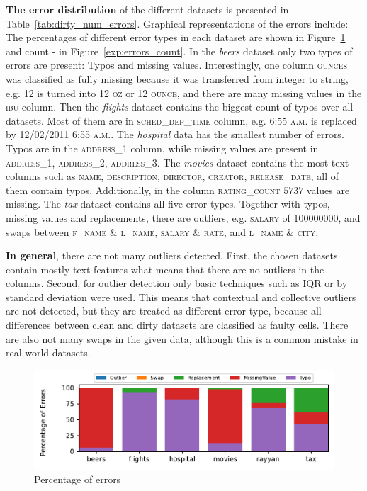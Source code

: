 \textbf{The error distribution} of the different datasets is presented in Table~\ref{tab:dirty_num_errors}. 
Graphical representations of the errors include: The percentages of different error types in each dataset are shown in Figure~\ref{exp:errors_percent} and count - in Figure~\ref{exp:errors_count}.
In the \textit{beers} dataset only two types of errors are present: Typos and missing values. 
Interestingly, one column \textsc{ounces} was classified as fully missing because it was transferred from integer to string, e.g. \textsc{12} is turned into \textsc{12 oz} or \textsc{12 ounce}, and there are many missing values in the \textsc{ibu} column.
Then the \textit{flights} dataset contains the biggest count of typos over all  datasets. 
Most of them are in \textsc{sched\_dep\_time} column, e.g. \textsc{6:55 a.m.} is replaced by \textsc{12/02/2011 6:55 a.m.}.
The \textit{hospital} data has the smallest number of errors. 
Typos are in the \textsc{address\_1} column, while missing values are present in \textsc{address\_1}, \textsc{address\_2}, \textsc{address\_3}.
The \textit{movies} dataset contains the most text columns such as \textsc{name}, \textsc{description}, \textsc{director}, \textsc{creator}, \textsc{release\_date}, all of them contain typos. Additionally, in the column \textsc{rating\_count} $5737$ values are missing.
The \textit{tax} dataset contains all five error types. 
Together with typos, missing values and replacements, there are outliers, e.g. \textsc{salary} of \textsc{100000000}, and swaps between \textsc{f\_name} \& \textsc{l\_name}, \textsc{salary} \& \textsc{rate}, and \textsc{l\_name} \& \textsc{city}. 

\textbf{In general}, there are not many outliers detected.
First, the chosen datasets contain mostly text features what means that there are no outliers in the columns.
Second, for outlier detection only basic techniques such as IQR or by standard deviation were used. 
This means that contextual and collective outliers are not detected, but they are treated as different error type, because all differences between clean and dirty datasets are classified as faulty cells.
There are also not many swaps in the given data, although this is a common mistake in real-world datasets.

\begin{figure}[!t]
    \centering
    \includegraphics[width=\textwidth]{figures/plot/error_percent/errors_percent.pdf}
    \caption{Percentage of errors}
    \label{exp:errors_percent}
\end{figure}

